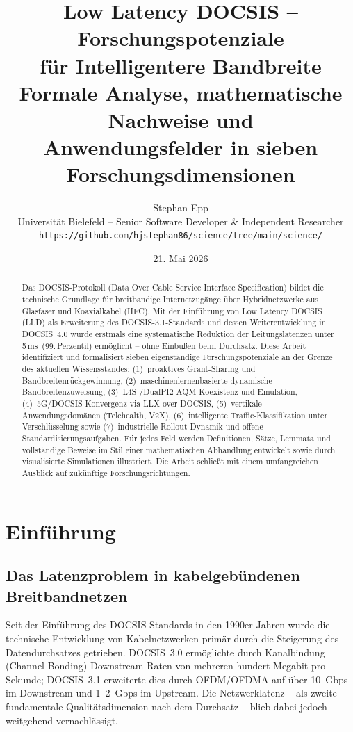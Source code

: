 ﻿\documentclass[a4paper,12pt]{article}
\title{\textbf{Low Latency DOCSIS -- Forschungspotenziale\\
f\"{u}r Intelligentere Bandbreite}\\
\large Formale Analyse, mathematische Nachweise und\\
Anwendungsfelder in sieben Forschungsdimensionen}
\author{Stephan Epp\\
\small Universit\"{a}t Bielefeld -- Senior Software Developer \& Independent Researcher\\
\small \texttt{https://github.com/hjstephan86/science/tree/main/science/}}
\date{21. Mai 2026}
\theoremstyle{definition}
\begin{document}
\maketitle

\begin{abstract}
\noindent
Das DOCSIS-Protokoll (Data Over Cable Service Interface Specification) bildet die
technische Grundlage f\"{u}r breitbandige Internetzug\"{a}nge \"{u}ber Hybridnetzwerke aus
Glasfaser und Koaxialkabel (HFC). Mit der Einf\"{u}hrung von Low Latency DOCSIS (LLD)
als Erweiterung des DOCSIS-3.1-Standards und dessen Weiterentwicklung in DOCSIS~4.0
wurde erstmals eine systematische Reduktion der Leitungslatenzen unter
5\,ms~(99.\,Perzentil) erm\"{o}glicht -- ohne Einbu{\ss}en beim Durchsatz. Diese Arbeit
identifiziert und formalisiert sieben eigenst\"{a}ndige Forschungspotenziale an der
Grenze des aktuellen Wissensstandes: (1)~proaktives Grant-Sharing und
Bandbreitenr\"{u}ckgewinnung, (2)~maschinenlernenbasierte dynamische Bandbreitenzuweisung,
(3)~L4S-/DualPI2-AQM-Koexistenz und Emulation, (4)~5G/DOCSIS-Konvergenz via
LLX-over-DOCSIS, (5)~vertikale Anwendungsdom\"{a}nen (Telehealth, V2X), (6)~intelligente
Traffic-Klassifikation unter Verschl\"{u}sselung sowie (7)~industrielle Rollout-Dynamik
und offene Standardisierungsaufgaben. F\"{u}r jedes Feld werden Definitionen, S\"{a}tze,
Lemmata und vollst\"{a}ndige Beweise im Stil einer mathematischen Abhandlung entwickelt
sowie durch visualisierte Simulationen illustriert. Die Arbeit schlie{\ss}t mit einem
umfangreichen Ausblick auf zuk\"{u}nftige Forschungsrichtungen.
\end{abstract}

\tableofcontents
\newpage

\section{Einf\"{u}hrung}

\subsection{Das Latenzproblem in kabelgeb\"{u}ndenen Breitbandnetzen}

Seit der Einf\"{u}hrung des DOCSIS-Standards in den 1990er-Jahren wurde die technische
Entwicklung von Kabelnetzwerken prim\"{a}r durch die Steigerung des Datendurchsatzes
getrieben. DOCSIS~3.0 erm\"{o}glichte durch Kanalbindung (Channel Bonding) Downstream-Raten
von mehreren hundert Megabit pro Sekunde; DOCSIS~3.1 erweiterte dies durch OFDM/OFDMA
auf \"{u}ber 10~Gbps im Downstream und 1--2~Gbps im Upstream. Die Netzwerklatenz -- als
zweite fundamentale Qualit\"{a}tsdimension nach dem Durchsatz -- blieb dabei jedoch
weitgehend vernachl\"{a}ssigt.
\end{document}
